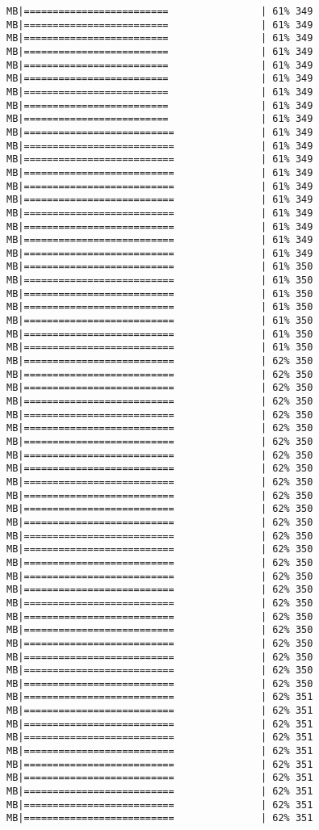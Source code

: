 \documentclass[
]{article}
\begin{document}
\begin{verbatim}
MB|=========================                | 61% 349 MB|=========================                | 61% 349 MB|=========================                | 61% 349 MB|=========================                | 61% 349 MB|=========================                | 61% 349 MB|=========================                | 61% 349 MB|=========================                | 61% 349 MB|=========================                | 61% 349 MB|=========================                | 61% 349 MB|==========================               | 61% 349 MB|==========================               | 61% 349 MB|==========================               | 61% 349 MB|==========================               | 61% 349 MB|==========================               | 61% 349 MB|==========================               | 61% 349 MB|==========================               | 61% 349 MB|==========================               | 61% 349 MB|==========================               | 61% 349 MB|==========================               | 61% 349 MB|==========================               | 61% 350 MB|==========================               | 61% 350 MB|==========================               | 61% 350 MB|==========================               | 61% 350 MB|==========================               | 61% 350 MB|==========================               | 61% 350 MB|==========================               | 61% 350 MB|==========================               | 62% 350 MB|==========================               | 62% 350 MB|==========================               | 62% 350 MB|==========================               | 62% 350 MB|==========================               | 62% 350 MB|==========================               | 62% 350 MB|==========================               | 62% 350 MB|==========================               | 62% 350 MB|==========================               | 62% 350 MB|==========================               | 62% 350 MB|==========================               | 62% 350 MB|==========================               | 62% 350 MB|==========================               | 62% 350 MB|==========================               | 62% 350 MB|==========================               | 62% 350 MB|==========================               | 62% 350 MB|==========================               | 62% 350 MB|==========================               | 62% 350 MB|==========================               | 62% 350 MB|==========================               | 62% 350 MB|==========================               | 62% 350 MB|==========================               | 62% 350 MB|==========================               | 62% 350 MB|==========================               | 62% 350 MB|==========================               | 62% 350 MB|==========================               | 62% 351 MB|==========================               | 62% 351 MB|==========================               | 62% 351 MB|==========================               | 62% 351 MB|==========================               | 62% 351 MB|==========================               | 62% 351 MB|==========================               | 62% 351 MB|==========================               | 62% 351 MB|==========================               | 62% 351 MB|==========================               | 62% 351 
\end{verbatim}
\end{document}
